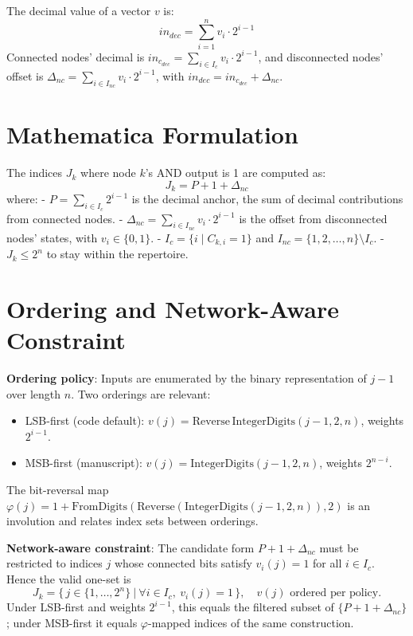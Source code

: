 \documentclass[12pt]{article}
\begin{document}
The decimal value of a vector \( v \) is:
\[
in_{dec} = \sum_{i=1}^{n} v_i \cdot 2^{i-1}
\]
Connected nodes’ decimal is \( in_{c_{dec}} = \sum_{i \in I_c} v_i \cdot 2^{i-1} \), and disconnected nodes’ offset is \( \Delta_{nc} = \sum_{i \in I_{nc}} v_i \cdot 2^{i-1} \), with \( in_{dec} = in_{c_{dec}} + \Delta_{nc} \).

\section{Mathematica Formulation}
The indices \( J_k \) where node \( k \)’s AND output is 1 are computed as:
\[
J_k = P + 1 + \Delta_{nc}
\]
where:
- \( P = \sum_{i \in I_c} 2^{i-1} \) is the decimal anchor, the sum of decimal contributions from connected nodes.
- \( \Delta_{nc} = \sum_{i \in I_{nc}} v_i \cdot 2^{i-1} \) is the offset from disconnected nodes’ states, with \( v_i \in \{0, 1\} \).
- \( I_c = \{i \mid C_{k,i} = 1\} \) and \( I_{nc} = \{1, 2, \dots, n\} \setminus I_c \).
- \( J_k \leq 2^n \) to stay within the repertoire.

\section{Ordering and Network-Aware Constraint}
\textbf{Ordering policy}: Inputs are enumerated by the binary representation of \(j-1\) over length \(n\). Two orderings are relevant:
\begin{itemize}
  \item LSB-first (code default): \(v(j)=\mathrm{Reverse}\,\mathrm{IntegerDigits}(j-1,2,n)\), weights \(2^{i-1}\).
  \item MSB-first (manuscript): \(v(j)=\mathrm{IntegerDigits}(j-1,2,n)\), weights \(2^{n-i}\).
\end{itemize}
The bit-reversal map \(\varphi(j)=1+\mathrm{FromDigits}(\mathrm{Reverse}(\mathrm{IntegerDigits}(j-1,2,n)),2)\) is an involution and relates index sets between orderings.

\textbf{Network-aware constraint}: The candidate form \(P+1+\Delta_{nc}\) must be restricted to indices \(j\) whose connected bits satisfy \(v_i(j)=1\) for all \(i\in I_c\). Hence the valid one-set is
\[
J_k=\Big\{\, j\in\{1,\dots,2^n\}\ \Big|\ \forall i\in I_c,\ v_i(j)=1\,\Big\},\quad v(j)\text{ ordered per policy}.
\]
Under LSB-first and weights \(2^{i-1}\), this equals the filtered subset of \(\{P+1+\Delta_{nc}\}\); under MSB-first it equals \(\varphi\)-mapped indices of the same construction.
\end{document}
